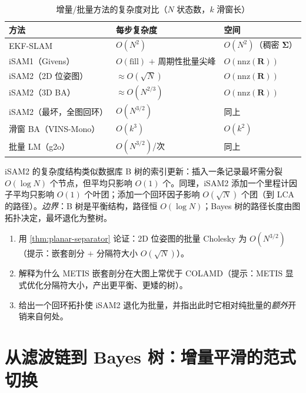 \begin{table}[H]\centering\small
\caption{增量/批量方法的复杂度对比（$N$ 状态数，$k$ 滑窗长）}
\label{tab:complexity}
\begin{tabular}{lll}
\toprule
方法 & 每步复杂度 & 空间 \\
\midrule
EKF-SLAM & $O(N^2)$ & $O(N^2)$（稠密 $\boldsymbol{\Sigma}$） \\
iSAM1（Givens） & $O(\text{fill})$ $+$ 周期性批量尖峰 & $O(\mathrm{nnz}(\mathbf{R}))$ \\
iSAM2（2D 位姿图） & $\approx O(\sqrt N)$ & $O(\mathrm{nnz}(\mathbf{R}))$ \\
iSAM2（3D BA） & $\approx O(N^{2/3})$ & $O(\mathrm{nnz}(\mathbf{R}))$ \\
iSAM2（最坏，全图回环） & $O(N^{3/2})$ & 同上 \\
滑窗 BA（VINS-Mono） & $O(k^3)$ & $O(k^2)$ \\
批量 LM（g2o） & $O(N^{3/2})$/次 & 同上 \\
\bottomrule
\end{tabular}
\end{table}

\begin{insight}
iSAM2 的复杂度结构类似数据库 B 树的索引更新：插入一条记录最坏需分裂 $O(\log N)$ 个节点，但平均只影响 $O(1)$ 个。同理，iSAM2 添加一个里程计因子平均只影响 $O(1)$ 个叶团；添加一个回环因子影响 $O(\sqrt N)$ 个团（到 LCA 的路径）。\emph{边界}：B 树是平衡结构，路径恒 $O(\log N)$；Bayes 树的路径长度由图拓扑决定，最坏退化为整树。
\end{insight}

\begin{practice}
\begin{enumerate}
  \item 用 \cref{thm:planar-separator} 论证：2D 位姿图的批量 Cholesky 为 $O(N^{3/2})$（提示：嵌套剖分 $+$ 分隔符大小 $O(\sqrt N)$）。
  \item 解释为什么 METIS 嵌套剖分在大图上常优于 COLAMD（提示：METIS 显式优化分隔符大小，产出更平衡、更矮的树）。
  \item 给出一个回环拓扑使 iSAM2 退化为批量，并指出此时它相对纯批量的\emph{额外}开销来自何处。
\end{enumerate}
\end{practice}

\section{从滤波链到 Bayes 树：增量平滑的范式切换}
\label{sec:isam-paradigm}

